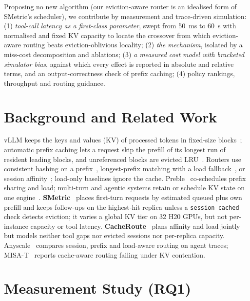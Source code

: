 \documentclass[conference]{IEEEtran}
\begin{document}
Proposing no new algorithm (our eviction-aware router is an idealised form of SMetric's scheduler), we contribute by measurement and trace-driven simulation: (1) \emph{tool-call latency as a first-class parameter}, swept from 50~ms to 60~s with normalised and fixed KV capacity to locate the crossover from which eviction-aware routing beats eviction-oblivious locality; (2) \emph{the mechanism}, isolated by a miss-cost decomposition and ablations; (3) \emph{a measured cost model with bracketed simulator bias}, against which every effect is reported in absolute and relative terms, and an output-correctness check of prefix caching; (4) policy rankings, throughput and routing guidance.

\section{Background and Related Work}
\label{sec:related}

vLLM keeps the keys and values (KV) of processed tokens in fixed-size blocks~\cite{r1}; automatic prefix caching lets a request skip the prefill of its longest run of resident leading blocks, and unreferenced blocks are evicted LRU~\cite{r10}. Routers use consistent hashing on a prefix~\cite{r11}, longest-prefix matching with a load fallback~\cite{r4}, or session affinity~\cite{r7}; load-only baselines ignore the cache. Preble~\cite{r3} co-schedules prefix sharing and load; multi-turn and agentic systems retain or schedule KV state on one engine~\cite{r15,r16,r19,r20}. \textbf{SMetric}~\cite{r8} places first-turn requests by estimated queued plus own prefill and keeps follow-ups on the highest-hit replica unless a \texttt{session\_cached} check detects eviction; it varies a global KV tier on 32 H20 GPUs, but not per-instance capacity or tool latency. \textbf{CacheRoute}~\cite{r9} plans affinity and load jointly but models neither tool gaps nor evicted sessions nor per-replica capacity. Anyscale~\cite{r21} compares session, prefix and load-aware routing on agent traces; MISA-T~\cite{r22} reports cache-aware routing failing under KV contention.

\section{Measurement Study (RQ1)}
\label{sec:measure}
\end{document}
